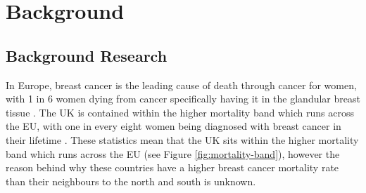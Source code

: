 \chapter{Background}

\section{Background Research}


In Europe, breast cancer is the leading cause of death through cancer for women, with 1 in 6 women dying from cancer specifically having it in the glandular breast tissue \cite{European_Commission_2009}. The UK is contained within the higher mortality band which runs across the EU, with one in every eight women being diagnosed with breast cancer in their lifetime \cite{Breast_cancer_statistics_2015}. These statistics mean that the UK sits within the higher mortality band which runs across the EU (see Figure \ref{fig:mortality-band}), however the reason behind why these countries have a higher breast cancer mortality rate than their neighbours to the north and south is unknown.


